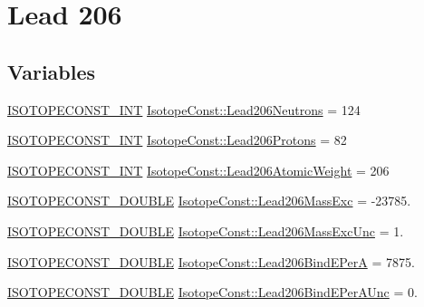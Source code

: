 \hypertarget{group___isotope_const-_lead-_pb206}{}\section{Lead 206}
\label{group___isotope_const-_lead-_pb206}
\subsection*{Variables}
\begin{DoxyCompactItemize}
\item 
\mbox{\hyperlink{group___isotope_const-_macros_ga5f18360b3e99483a35c32d789e62621c}{I\+S\+O\+T\+O\+P\+E\+C\+O\+N\+S\+T\+\_\+\+I\+NT}} \mbox{\hyperlink{group___isotope_const-_lead-_pb206_gad514b6a3317e7ff5aec69d36038a6d5a}{Isotope\+Const\+::\+Lead206\+Neutrons}} = 124
\item 
\mbox{\hyperlink{group___isotope_const-_macros_ga5f18360b3e99483a35c32d789e62621c}{I\+S\+O\+T\+O\+P\+E\+C\+O\+N\+S\+T\+\_\+\+I\+NT}} \mbox{\hyperlink{group___isotope_const-_lead-_pb206_ga665973506b64ff9416506643525d8eab}{Isotope\+Const\+::\+Lead206\+Protons}} = 82
\item 
\mbox{\hyperlink{group___isotope_const-_macros_ga5f18360b3e99483a35c32d789e62621c}{I\+S\+O\+T\+O\+P\+E\+C\+O\+N\+S\+T\+\_\+\+I\+NT}} \mbox{\hyperlink{group___isotope_const-_lead-_pb206_ga0783575b865cbbc1b8d82b9f4f8f1622}{Isotope\+Const\+::\+Lead206\+Atomic\+Weight}} = 206
\item 
\mbox{\hyperlink{group___isotope_const-_macros_ga8f45a7272ce02c0b4c65c44636ed719a}{I\+S\+O\+T\+O\+P\+E\+C\+O\+N\+S\+T\+\_\+\+D\+O\+U\+B\+LE}} \mbox{\hyperlink{group___isotope_const-_lead-_pb206_ga7bb20e10d08ac2090431c96226d4c192}{Isotope\+Const\+::\+Lead206\+Mass\+Exc}} = -\/23785.
\item 
\mbox{\hyperlink{group___isotope_const-_macros_ga8f45a7272ce02c0b4c65c44636ed719a}{I\+S\+O\+T\+O\+P\+E\+C\+O\+N\+S\+T\+\_\+\+D\+O\+U\+B\+LE}} \mbox{\hyperlink{group___isotope_const-_lead-_pb206_ga3e34e7c184132589f813ce471f77cbf5}{Isotope\+Const\+::\+Lead206\+Mass\+Exc\+Unc}} = 1.
\item 
\mbox{\hyperlink{group___isotope_const-_macros_ga8f45a7272ce02c0b4c65c44636ed719a}{I\+S\+O\+T\+O\+P\+E\+C\+O\+N\+S\+T\+\_\+\+D\+O\+U\+B\+LE}} \mbox{\hyperlink{group___isotope_const-_lead-_pb206_gac103f3b85ac23ec8ef0ff84c8c10b5c0}{Isotope\+Const\+::\+Lead206\+Bind\+E\+PerA}} = 7875.
\item 
\mbox{\hyperlink{group___isotope_const-_macros_ga8f45a7272ce02c0b4c65c44636ed719a}{I\+S\+O\+T\+O\+P\+E\+C\+O\+N\+S\+T\+\_\+\+D\+O\+U\+B\+LE}} \mbox{\hyperlink{group___isotope_const-_lead-_pb206_ga76866f2f4dfe0a7f9b1a2d2f0df6534a}{Isotope\+Const\+::\+Lead206\+Bind\+E\+Per\+A\+Unc}} = 0.

\end{DoxyCompactItemize}
